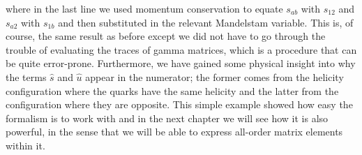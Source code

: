 where in the last line we used momentum conservation to equate $s_{ab}$ with $s_{12}$ and $s_{a2}$ with $s_{1b}$ and then substituted in the relevant Mandelstam variable. This is, of course, the same result as before except we did not have to go through the trouble of evaluating the traces of gamma matrices, which is a procedure that can be quite error-prone. Furthermore, we have gained some physical insight into why the terms $\hat{s}$ and $\hat{u}$ appear in the numerator; the former comes from the helicity configuration where the quarks have the same helicity and the latter from the configuration where they are opposite. This simple example showed how easy the formalism is to work with and in the next chapter we will see how it is also powerful, in the sense that we will be able to express all-order matrix elements within it. 
